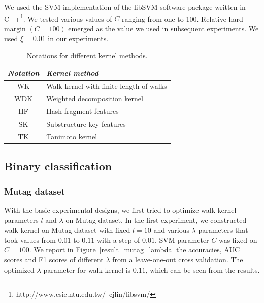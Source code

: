 \documentclass[english]{tktltiki}
\begin{document}
We used the SVM implementation of the libSVM software package written in C++\footnote{http://www.csie.ntu.edu.tw/~cjlin/libsvm/}. We tested various values of $C$ ranging from one to 100. Relative hard margin $(C=100)$ emerged as the value we used in subsequent experiments. We used $\xi = 0.01$ in our experiments.

\begin{center}
\begin{table}
\centering
\begin{tabular}{|c||p{5.8cm}|}\hline
\textbf{\em Notation}	&\textbf{\em Kernel method}\\ \hline \hline
WK & Walk kernel with finite length of walks \\ \hline
WDK & Weighted decomposition kernel \\ \hline
HF & Hash fragment features \\ \hline
SK & Substructure key features \\ \hline
TK & Tanimoto kernel \\ \hline
\end{tabular}
\caption[Notations for different kernel methods.]{Notations for different kernel methods.}
\label{kernel_notation}
\end{table}
\end{center}


\subsection{Binary classification}

\subsubsection{Mutag dataset}

With the basic experimental designs, we first tried to optimize walk kernel parameters $l$ and $\lambda$ on Mutag dataset. In the first experiment, we constructed walk kernel on Mutag dataset with fixed $l=10$ and various $\lambda$ parameters that took values from $0.01$ to $0.11$ with a step of $0.01$. SVM parameter $C$ was fixed on $C=100$. We report in Figure~\ref{result_mutag_lambda} the accuracies, AUC scores and F1 scores of different $\lambda$ from a leave-one-out cross validation. The optimized $\lambda$ parameter for walk kernel is $0.11$, which can be seen from the results. 
\end{document}
